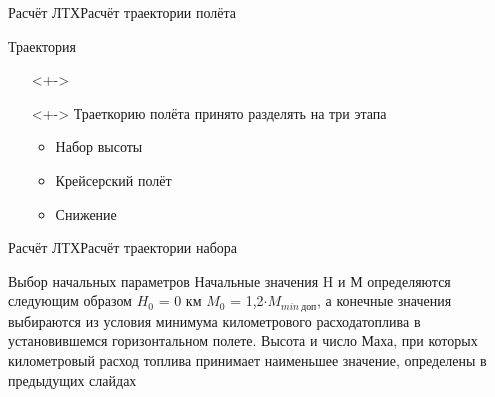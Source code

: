 \begin{frame}{Расчёт ЛТХ}{Расчёт траектории полёта}
    \begin{block}{Траектория}
    \begin{itemize}
        \item [] <+->
        \item [] <+-> Траеткорию полёта принято разделять на три этапа 
            \begin{itemize}
                \item Набор высоты 
                \item Крейсерский полёт 
                \item Снижение 
            \end{itemize}
    \end{itemize}
    \end{block}
\end{frame}

\begin{frame}{Расчёт ЛТХ}{Расчёт траектории набора}
    \begin{block}{Выбор начальных параметров}
        Начальные значения H и М определяются следующим образом $H_0$ = 0 км $M_0$ = 1,2$\cdot M_{min \ \text{доп}}$, а конечные значения выбираются из
        условия минимума километрового расходатоплива в установившемся горизонтальном полете. Высота и число Маха, при которых километровый расход 
        топлива принимает наименьшее значение, определены в предыдущих слайдах 
    \end{block}
\end{frame}

